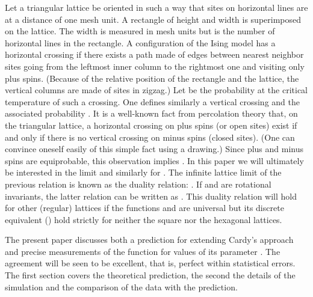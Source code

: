 \documentclass[a4paper,12pt]{article}
\begin{document}
Let a triangular lattice be oriented in such a way that sites on horizontal
lines are at a distance of one mesh unit. A rectangle of height \coordHE{} and width
\coordHE{} is superimposed on the lattice. The width \coordHE{} is measured in mesh units
but \coordHE{} is the number of horizontal lines in the rectangle. A configuration of the 
Ising model has a horizontal crossing if there exists a path made of edges between 
nearest neighbor sites going
from the leftmost inner column to the rightmost one and visiting only plus
spins. (Because of the relative position of the rectangle and the lattice,
the vertical columns are made of sites in zigzag.) Let \coordHE{} be the
probability at the critical temperature of such a crossing. One defines
similarly a vertical crossing and the associated probability \coordHE{}.
It is a well-known fact from percolation theory that, on the triangular
lattice, a horizontal crossing on plus spins (or open sites)
exist if and only if there is no vertical crossing on minus spins
(closed sites). (One can convince oneself easily of this
simple fact using a drawing.) Since plus and minus spins are equiprobable,
this observation implies \coordHE{}. In this paper we will 
ultimately be interested in the limit \coordHE{} and similarly for \coordHE{}. The infinite lattice limit of the previous
relation is known as the duality relation: \coordHE{}. If \coordHE{}
and \coordHE{} are rotational invariants, the latter relation can be written as
\coordHE{}. This duality relation will hold for other
(regular) lattices if the functions \coordHE{} and \coordHE{} are universal but
its discrete equivalent (\coordHE{}) hold strictly for neither
the square nor the hexagonal lattices.

The present paper discusses both a prediction for \coordHE{} extending Cardy's
approach and precise measurements of the function \coordHE{} for \coordHE{} values
of its parameter \coordHE{}. The agreement will be seen to be excellent, that is,
perfect within statistical errors. The first section
covers the theoretical prediction, the second the details of the simulation
and the comparison of the data with the prediction.
\end{document}
